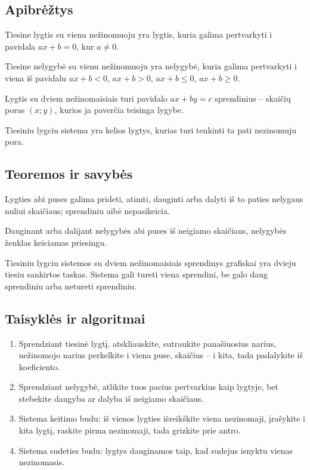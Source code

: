 \subsection{Apibrėžtys}
\begin{apibreztis}
Tiesine lygtis su vienu nežinomuoju yra lygtis, kuria galima pertvarkyti i pavidala $ax+b=0$, kur $a\ne0$.
\end{apibreztis}
\begin{apibreztis}
Tiesine nelygybė su vienu nežinomuoju yra nelygybė, kuria galima pertvarkyti i viena iš pavidalu $ax+b<0$, $ax+b>0$, $ax+b\le0$, $ax+b\ge0$.
\end{apibreztis}
\begin{apibreztis}
Lygtis su dviem nežinomaisiais turi pavidalo $ax+by=c$ sprendinius -- skaičių poras $(x;y)$, kurios ja paverčia teisinga lygybe.
\end{apibreztis}
\begin{apibreztis}
Tiesiniu lygciu sistema yra kelios lygtys, kurias turi tenkinti ta pati nezinomuju pora.
\end{apibreztis}

\subsection{Teoremos ir savybės}
\begin{savybe}
Lygties abi puses galima prideti, atimti, dauginti arba dalyti iš to paties nelygaus nuliui skaičiaus; sprendiniu aibė nepasikeicia.
\end{savybe}
\begin{savybe}
Dauginant arba dalijant nelygybės abi puses iš neigiamo skaičiaus, nelygybės ženklas keiciamas priesingu.
\end{savybe}
\begin{savybe}
Tiesiniu lygciu sistemos su dviem nežinomaisiais sprendinys grafiskai yra dvieju tiesiu sankirtos taskas. Sistema gali tureti viena sprendini, be galo daug sprendiniu arba netureti sprendiniu.
\end{savybe}

\subsection{Taisyklės ir algoritmai}
\begin{enumerate}[label=\arabic*.]
\item Sprendziant tiesinė lygtį, atskliauskite, sutraukite panašiuosius narius, nežinomojo narius perkelkite i viena puse, skaičius -- i kita, tada padalykite iš koeficiento.
\item Sprendziant nelygybė, atlikite tuos pacius pertvarkius kaip lygtyje, bet stebekite daugyba ar dalyba iš neigiamo skaičiaus.
\item Sistema keitimo budu: iš vienos lygties išreikškite viena nezinomaji, įrašykite i kita lygtį, raskite pirma nezinomaji, tada grizkite prie antro.
\item Sistema sudeties budu: lygtys dauginamos taip, kad sudejus isnyktu vienas nezinomasis.
\end{enumerate}
